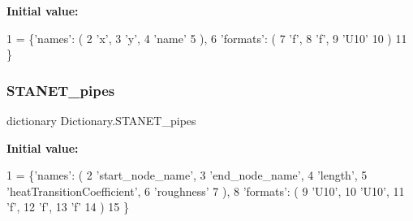 {\bfseries Initial value\+:}
\begin{DoxyCode}
1 =           \{\textcolor{stringliteral}{'names'}: (
2                                 \textcolor{stringliteral}{'x'},
3                                 \textcolor{stringliteral}{'y'},
4                                 \textcolor{stringliteral}{'name'}
5                                 ),
6                        \textcolor{stringliteral}{'formats'}: (
7                                 \textcolor{stringliteral}{'f'},
8                                 \textcolor{stringliteral}{'f'},
9                                 \textcolor{stringliteral}{'U10'}
10                                 )
11                                \}
\end{DoxyCode}
\mbox{\label{namespace_dictionary_a57c00cf376cd84145639bfb65b4e155c}} 
\subsubsection{\texorpdfstring{S\+T\+A\+N\+E\+T\+\_\+pipes}{STANET\_pipes}}
{\footnotesize\ttfamily dictionary Dictionary.\+S\+T\+A\+N\+E\+T\+\_\+pipes}

{\bfseries Initial value\+:}
\begin{DoxyCode}
1 =           \{\textcolor{stringliteral}{'names'}: (
2                                 \textcolor{stringliteral}{'start\_node\_name'},
3                                 \textcolor{stringliteral}{'end\_node\_name'},
4                                 \textcolor{stringliteral}{'length'},
5                                 \textcolor{stringliteral}{'heatTransitionCoefficient'},
6                                 \textcolor{stringliteral}{'roughness'}
7                                 ),
8                        \textcolor{stringliteral}{'formats'}: (
9                                 \textcolor{stringliteral}{'U10'},
10                                 \textcolor{stringliteral}{'U10'},
11                                 \textcolor{stringliteral}{'f'},
12                                 \textcolor{stringliteral}{'f'},
13                                 \textcolor{stringliteral}{'f'}
14                                 )
15                                \}
\end{DoxyCode}
\mbox{\label{namespace_dictionary_aeea7b54a3132a64d164394f80e275ee1}} 
